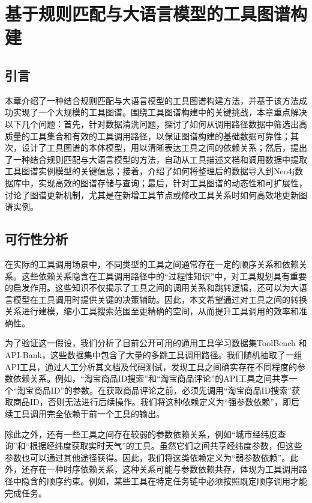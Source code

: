 \chapter{基于规则匹配与大语言模型的工具图谱构建}

\section{引言}

本章介绍了一种结合规则匹配与大语言模型的工具图谱构建方法，并基于该方法成功实现了一个大规模的工具图谱。围绕工具图谱构建中的关键挑战，本章重点解决以下几个问题：首先，针对数据清洗问题，探讨了如何从调用路径数据中筛选出高质量的工具集合和有效的工具调用路径，以保证图谱构建的基础数据可靠性；其次，设计了工具图谱的本体模型，用以清晰表达工具之间的依赖关系；然后，提出了一种结合规则匹配与大语言模型的方法，自动从工具描述文档和调用数据中提取工具图谱实例模型的关键信息；接着，介绍了如何将整理后的数据导入到Neo4j数据库中，实现高效的图谱存储与查询；最后，针对工具图谱的动态性和可扩展性，讨论了图谱更新机制，尤其是在新增工具节点或修改工具关系时如何高效地更新图谱实例。

\section{可行性分析}

在实际的工具调用场景中，不同类型的工具之间通常存在一定的顺序关系和依赖关系。这些依赖关系隐含在工具调用路径中的“过程性知识”中，对工具规划具有重要的启发作用。这些知识不仅揭示了工具之间的调用关系和跳转逻辑，还可以为大语言模型在工具调用时提供关键的决策辅助。因此，本文希望通过对工具之间的转换关系进行建模，缩小工具搜索范围至更精确的空间，从而提升工具调用的效率和准确性。

为了验证这一假设，我们分析了目前公开可用的通用工具学习数据集ToolBench\cite{Qin2023} 和 API-Bank\cite{Li2023c}，这些数据集中包含了大量的多跳工具调用路径。我们随机抽取了一组API工具，通过人工分析其文档及代码测试，发现工具之间确实存在不同程度的参数依赖关系。例如，“淘宝商品ID搜索”和“淘宝商品评论”的API工具之间共享一个“淘宝商品ID”的参数。在获取商品评论之前，必须先调用“淘宝商品ID搜索”获取商品ID，否则无法进行后续操作。我们将这种依赖定义为“强参数依赖”，即后续工具调用完全依赖于前一个工具的输出。

除此之外，还有一些工具之间存在较弱的参数依赖关系，例如“城市经纬度查询”和“根据经纬度获取实时天气”的工具。虽然它们之间共享经纬度参数，但这些参数也可以通过其他途径获得。因此，我们将这类依赖定义为“弱参数依赖”。此外，还存在一种时序依赖关系，这种关系可能与参数依赖共存，体现为工具调用路径中隐含的顺序约束。例如，某些工具在特定任务链中必须按照既定顺序调用才能完成任务。

